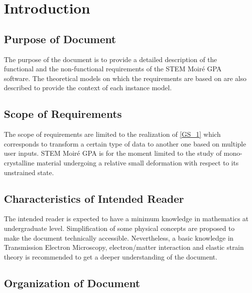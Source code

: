 \documentclass[12pt]{article}
\newcommand{\progname}{STEM Moir{\'e} GPA}
\begin{document}
\newpage
{}

\section{Introduction}

\subsection{Purpose of Document}

The purpose of the document is to provide a detailed description of the functional and the non-functional requirements of the \progname{} software.  The theoretical models on which the requirements are based on are also described to provide the context of each instance model.


\subsection{Scope of Requirements} 

The scope of requirements are limited to the realization of \cref{GS_1} which corresponds to transform a certain type of data to another one based on multiple user inputs. \progname{} is for the moment limited to the study of mono-crystalline material undergoing a relative small deformation with respect to its unstrained state.

\subsection{Characteristics of Intended Reader} 

The intended reader is expected to have a minimum knowledge in mathematics at
undergraduate level. Simplification of some physical concepts are proposed to
make the document technically accessible. Nevertheless, a basic knowledge in
Transmission Electron Microscopy, electron/matter interaction and elastic strain
theory is recommended to get a deeper understanding of the document. 

\subsection{Organization of Document}
\end{document}
